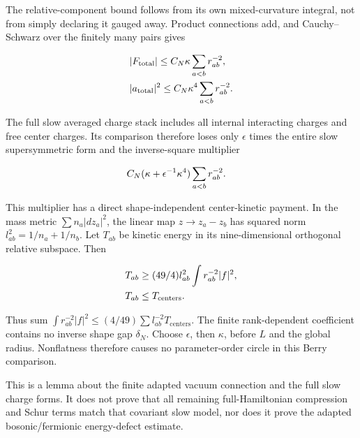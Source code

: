 The relative-component bound follows from its own mixed-curvature
integral, not from simply declaring it gauged away. Product connections
add, and Cauchy--Schwarz over the finitely many pairs gives

\begin{gather*}
\begin{aligned}
& \vert F_{\mathrm{total}}\vert \le C_{N} \kappa  \sum _{a<b} r_{ab}^{-2}, \\
& \vert a_{\mathrm{total}}\vert ^{2}\le C_{N} \kappa ^{4} \sum _{a<b} r_{ab}^{-2}.
\end{aligned}\notag
\end{gather*}

The full slow averaged charge stack includes all internal interacting
charges and free center charges. Its comparison therefore loses only
\(\epsilon\) times the entire slow supersymmetric form and the
inverse-square multiplier

\begin{gather*}
\begin{aligned}
& C_{N}(\kappa +\epsilon ^{-1}\kappa ^{4}) \sum _{a<b} r_{ab}^{-2}.
\end{aligned}\notag
\end{gather*}

This multiplier has a direct shape-independent center-kinetic payment.
In the mass metric \(\sum  n_{a}\vert dz_{a}\vert ^{2}\), the linear map
\(z\to z_{a}-z_{b}\) has squared norm \(l_{ab}^{2}=1/n_{a}+1/n_{b}\).
Let \(T_{ab}\) be kinetic energy in its nine-dimensional orthogonal
relative subspace. Then

\begin{gather*}
\begin{aligned}
& T_{ab} \ge  (49/4) l_{ab}^{2} \int  r_{ab}^{-2}\vert f\vert ^{2}, \\
& T_{ab} \le  T_{\mathrm{centers}}.
\end{aligned}\notag
\end{gather*}

Thus sum
\(\int  r_{ab}^{-2}\vert f\vert ^{2} \le (4/49) \sum  l_{ab}^{-2} T_{\mathrm{centers}}\).
The finite rank-dependent coefficient contains no inverse shape gap
\(\delta _{N}\). Choose \(\epsilon\), then \(\kappa\), before \(L\) and
the global radius. Nonflatness therefore causes no parameter-order
circle in this Berry comparison.

This is a lemma about the finite adapted vacuum connection and the full
slow charge forms. It does not prove that all remaining full-Hamiltonian
compression and Schur terms match that covariant slow model, nor does it
prove the adapted bosonic/fermionic energy-defect estimate.
